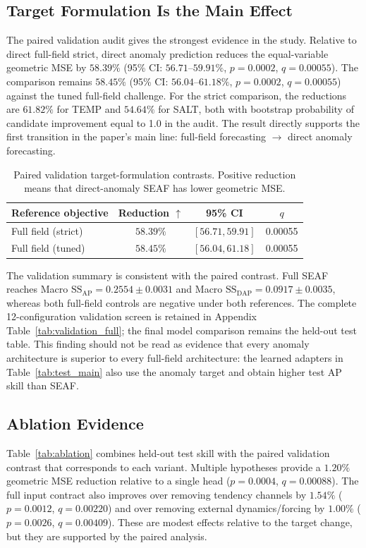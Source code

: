\documentclass[conference]{IEEEtran}
\begin{document}
\subsection{Target Formulation Is the Main Effect}
The paired validation audit gives the strongest evidence in the study. Relative to direct full-field strict, direct anomaly prediction reduces the equal-variable geometric MSE by $58.39\%$ (95\% CI: $56.71$--$59.91\%$, $p=0.0002$, $q=0.00055$). The comparison remains $58.45\%$ (95\% CI: $56.04$--$61.18\%$, $p=0.0002$, $q=0.00055$) against the tuned full-field challenge. For the strict comparison, the reductions are $61.82\%$ for TEMP and $54.64\%$ for SALT, both with bootstrap probability of candidate improvement equal to 1.0 in the audit. The result directly supports the first transition in the paper's main line: full-field forecasting $\rightarrow$ direct anomaly forecasting.

\begin{table}[H]
\centering
\caption{Paired validation target-formulation contrasts. Positive reduction means that direct-anomaly SEAF has lower geometric MSE.}
\label{tab:target_contrast}
\footnotesize
\setlength{\tabcolsep}{4pt}
\renewcommand{\arraystretch}{1.12}
\begin{tabular}{lccc}
\toprule
Reference objective & Reduction $\uparrow$ & 95\% CI & $q$\\
\midrule
Full field (strict) & $\mathbf{58.39\%}$ & $[56.71,59.91]$ & 0.00055\\
Full field (tuned) & $\mathbf{58.45\%}$ & $[56.04,61.18]$ & 0.00055\\
\bottomrule
\end{tabular}
\end{table}

The validation summary is consistent with the paired contrast. Full SEAF reaches Macro $\mathrm{SS}_{\mathrm{AP}}=0.2554\pm0.0031$ and Macro $\mathrm{SS}_{\mathrm{DAP}}=0.0917\pm0.0035$, whereas both full-field controls are negative under both references. The complete 12-configuration validation screen is retained in Appendix Table~\ref{tab:validation_full}; the final model comparison remains the held-out test table. This finding should not be read as evidence that every anomaly architecture is superior to every full-field architecture: the learned adapters in Table~\ref{tab:test_main} also use the anomaly target and obtain higher test AP skill than SEAF.

\subsection{Ablation Evidence}
Table~\ref{tab:ablation} combines held-out test skill with the paired validation contrast that corresponds to each variant. Multiple hypotheses provide a $1.20\%$ geometric MSE reduction relative to a single head ($p=0.0004$, $q=0.00088$). The full input contract also improves over removing tendency channels by $1.54\%$ ($p=0.0012$, $q=0.00220$) and over removing external dynamics/forcing by $1.00\%$ ($p=0.0026$, $q=0.00409$). These are modest effects relative to the target change, but they are supported by the paired analysis.
\end{document}
